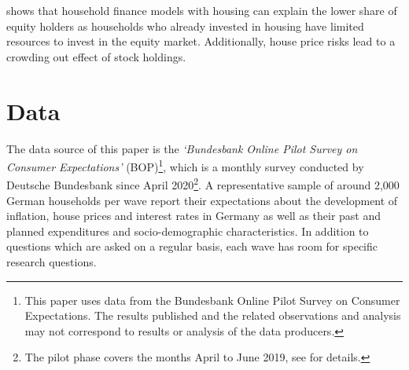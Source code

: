 \documentclass[ProjectABM]{subfiles}
\begin{document}
\cite{cocco2005housing} shows that household finance models with housing can explain the lower share of equity holders as households who already invested in housing have limited resources to invest in the equity market. Additionally, house price risks lead to a crowding out effect of stock holdings.







\section{Data}\label{sec:data}

The data source of this paper is the \textit{`Bundesbank Online Pilot Survey on Consumer Expectations'} (BOP)\footnote{This paper uses data from the Bundesbank Online Pilot Survey on Consumer Expectations. The results published and the related observations and analysis may not correspond to results or analysis of the data producers.}, which is a monthly survey conducted by Deutsche Bundesbank since April 2020\footnote{The pilot phase covers the months April to June 2019, see \cite{bundesbank_2020} for details.}. A representative sample of around 2,000 German households per wave report their expectations about the development of inflation, house prices and interest rates in Germany as well as their past and planned expenditures and socio-demographic characteristics. In addition to questions which are asked on a regular basis, each wave has room for specific research questions.
\end{document}
